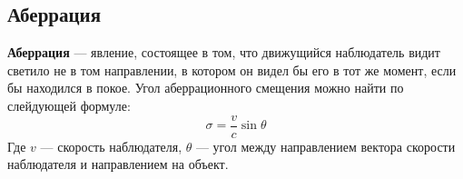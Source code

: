 \subsection{Аберрация}

\textbf{Аберрация} --- явление, состоящее в том, что движущийся наблюдатель видит светило не в том направлении, в котором он видел бы его в тот же момент, если бы находился в покое. 
Угол аберрационного смещения можно найти по слейдующей формуле:
$$\sigma=\frac{v}{c}\sin\theta$$
Где $v$ --- скорость наблюдателя, $\theta$ --- угол между направлением вектора скорости наблюдателя и направлением на объект.